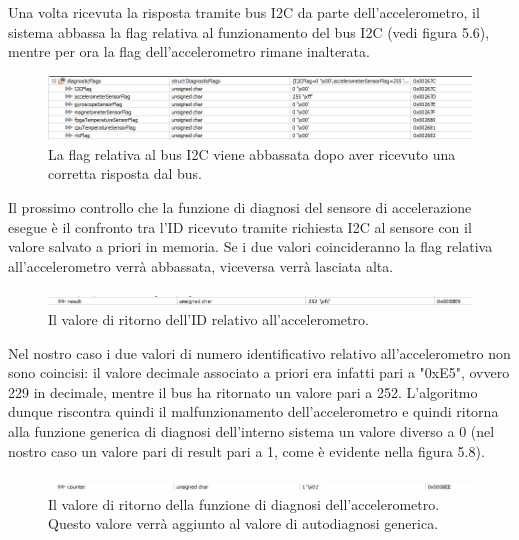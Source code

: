 \documentclass[LaM,binding=0.6cm]{../sapthesis}
\begin{document}
Una volta ricevuta la risposta tramite bus I2C da parte dell'accelerometro, il sistema abbassa la flag relativa al funzionamento del bus I2C (vedi figura 5.6), mentre per ora la flag dell'accelerometro rimane inalterata.\newline

\begin{figure}[htbp]
\centerline{\includegraphics[scale=0.6]{examples/3_accelerometerI2CGoodConnection.JPG}}
\caption{La flag relativa al bus I2C viene abbassata dopo aver ricevuto una corretta risposta dal bus.}
\label{fig}
\end{figure}

Il prossimo controllo che la funzione di diagnosi del sensore di accelerazione esegue è il confronto tra l'ID ricevuto tramite richiesta I2C al sensore con il valore salvato a priori in memoria. Se i due valori coincideranno la flag relativa all'accelerometro verrà abbassata, viceversa verrà lasciata alta.\newline

\begin{figure}[htbp]
\centerline{\includegraphics[scale=0.65]{examples/4_badAccelerometerId.JPG}}
\caption{Il valore di ritorno dell'ID relativo all'accelerometro.}
\label{fig}
\end{figure}

Nel nostro caso i due valori di numero identificativo relativo all'accelerometro non sono coincisi: il valore decimale associato a priori era infatti pari a "0xE5", ovvero 229 in decimale, mentre il bus ha ritornato un valore pari a 252. L'algoritmo dunque riscontra quindi il malfunzionamento dell'accelerometro e quindi ritorna alla funzione generica di diagnosi dell'interno sistema un valore diverso a 0 (nel nostro caso un valore pari di result pari a 1, come è evidente nella figura 5.8).\newline

\begin{figure}[htbp]
\centerline{\includegraphics[scale=0.6]{examples/5_accelerometerCounter.JPG}}
\caption{Il valore di ritorno della funzione di diagnosi dell'accelerometro. Questo valore verrà aggiunto al valore di autodiagnosi generica.}
\label{fig}
\end{figure}
\end{document}
